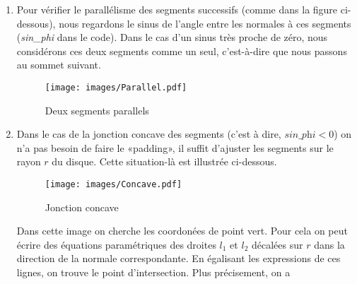\documentclass[12pt]{article}
\begin{document}
	\begin{enumerate} 
		\item Pour vérifier le parallélisme des segments successifs (comme dans la figure ci-dessous), nous regardons le sinus de l'angle entre les normales à ces segments (\textit{sin\_phi} dans le code). Dans le cas d'un sinus très proche de zéro, nous considérons ces deux segments comme un seul, c'est-à-dire que nous passons au sommet suivant.
		
		\begin{figure}[H]
			\centering
			\texttt{[image: images/Parallel.pdf]}
			\caption{Deux segments parallels}
			\label{fig:parallels}
		\end{figure}
		
		\item Dans le cas de la jonction concave des segments (c’est à dire, $\textit{sin\_phi} < 0$) on n’a pas besoin de faire le «padding», il suffit d'ajuster les segments sur le rayon $r$ du disque. Cette situation-là est illustrée ci-dessous.
		
		\begin{figure}[H]
			\centering
			\texttt{[image: images/Concave.pdf]}
			\caption{Jonction concave}
			\label{fig:concave}
		\end{figure}
		
		Dans cette image on cherche les coordonées de point vert. Pour cela on peut écrire des équations paramétriques des droites $l_1$ et $l_2$ décalées sur $r$ dans la direction de la normale correspondante. En égalisant les expressions de ces lignes, on trouve le point d'intersection. Plus précisement, on a
		

\end{enumerate}
\end{document}

